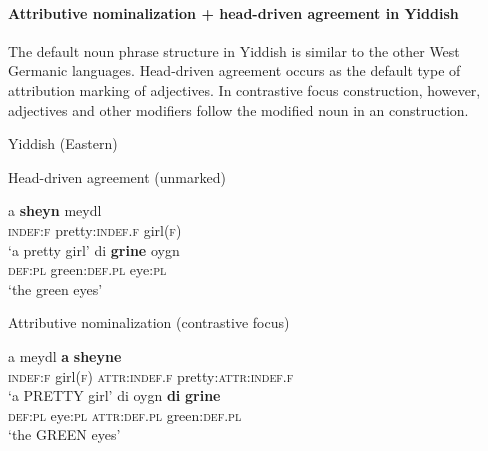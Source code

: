 \paragraph*{Attributive nominalization + head\hyp{}driven agreement in Yiddish} \label{yiddish synchr}
The default noun phrase structure in Yiddish is similar to the other West Germanic languages. Head\hyp{}driven agreement occurs as the default type of attribution marking of adjectives. In contrastive focus construction, however, adjectives and other modifiers follow the modified noun in an  construction.
\begin{exe}
\ex \rm{Yiddish (Eastern) \citep[96]{jacobs-etal1994}}
\begin{xlist}
\ex \rm{Head\hyp{}driven agreement (unmarked)}
\begin{xlist}
\ex 
\gll	a \textbf{sheyn} meydl\\
	\textsc{indef:f} pretty:\textsc{indef.f} girl\textsc{(f)}\\
\glt	‘a pretty girl’
\ex
\gll	di \textbf{grine} oygn\\
	\textsc{def:pl} green:\textsc{def.pl} eye:\textsc{pl}\\
\glt	‘the green eyes’
\end{xlist}
\ex \rm{Attributive nominalization (contrastive focus)}
\begin{xlist}
\ex
\gll	a meydl \textbf{a} \textbf{sheyne}\\
	\textsc{indef:f} girl\textsc{(f)} \textsc{attr:indef.f} pretty:\textsc{attr:indef.f}\\
\glt	‘a PRETTY girl’
\ex
\gll	di oygn \textbf{di} \textbf{grine}\\
	\textsc{def:pl} eye:\textsc{pl} \textsc{attr:def.pl} green:\textsc{def.pl} \\
\glt	‘the GREEN eyes’
\end{xlist}
\end{xlist}
\end{exe}

